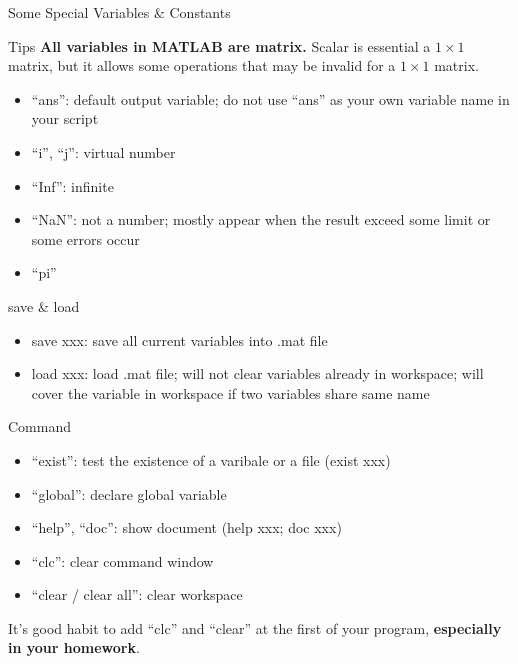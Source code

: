 \begin{frame}{Some Special Variables \& Constants}
\begin{block}{Tips}
\textbf{All variables in MATLAB are matrix.} Scalar is essential a $1\times1$ matrix, but it allows some operations that may be invalid for a $1\times1$ matrix.
\end{block}
\begin{itemize}
\item ``ans'': default output variable; do not use ``ans'' as your own variable name in your script
\item ``i'', ``j'': virtual number
\item ``Inf'': infinite
\item ``NaN'': not a number; mostly appear when the result exceed some limit or some errors occur
\item ``pi''
\end{itemize}

\begin{block}{save \& load}
\begin{itemize}
\item save xxx: save all current variables into .mat file
\item load xxx: load .mat file; will not clear variables already in workspace; will cover the variable in workspace if two variables share same name
\end{itemize}
\end{block}
\end{frame}

\begin{frame}{Command}
\begin{itemize}
\item ``exist'': test the existence of a varibale or a file (exist xxx)
\item ``global'': declare global variable
\item ``help'', ``doc'': show document (help xxx; doc xxx)
\item ``clc'': clear command window
\item ``clear / clear all'': clear workspace
\end{itemize}
It's good habit to add ``clc'' and ``clear'' at the first of your program, \textbf{especially in your homework}.
\end{frame}

